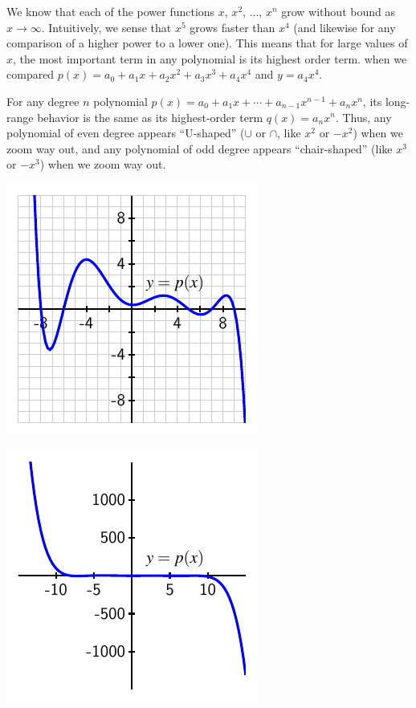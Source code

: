 \documentclass{ximera}
\begin{document}
We know that each of the power functions $x$, $x^2$, $\ldots$, $x^n$ grow without bound as $x \to \infty$.  Intuitively, we sense that $x^5$ grows faster than $x^4$ (and likewise for any comparison of a higher power to a lower one).  This means that for large values of $x$, the most important term in any polynomial is its highest order term. when we compared $p(x) = a_0 + a_1 x + a_2 x^2 + a_3 x^3 + a_4 x^4$ and $y = a_4 x^4$.%


For any degree $n$ polynomial $p(x) = a_0 + a_1 x + \cdots + a_{n-1}x^{n-1} + a_n x^n$, its long-range behavior is the same as its highest-order term $q(x) = a_n x^n$.  Thus, any polynomial of even degree appears ``U-shaped'' ($\cup$ or $\cap$, like $x^2$ or $-x^2$) when we zoom way out, and any polynomial of odd degree appears ``chair-shaped'' (like $x^3$ or $-x^3$) when we zoom way out.%

\begin{image}
\includegraphics{poly-degree-7-near.pdf}
\end{image}

\begin{image}
\includegraphics{poly-degree-7-far.pdf}
\end{image}
\end{document}
